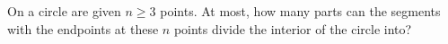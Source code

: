 On a circle are given $n\ge 3$ points. At most, how many parts can the segments with the endpoints at these $n$ points divide the interior of the circle into?